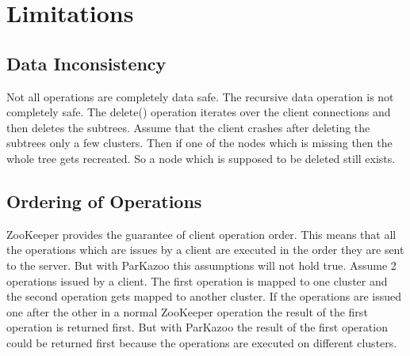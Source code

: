 \chapter{Limitations}

\section{Data Inconsistency}
Not all operations are completely data safe. The recursive data operation is not completely safe. The delete() operation iterates over the client connections and then deletes the subtrees. Assume that the client crashes after deleting the subtrees only a few clusters. Then if one of the nodes which is missing then the whole tree gets recreated. So a node which is supposed to be deleted still exists.


\section{Ordering of Operations}
ZooKeeper provides the guarantee of client operation order. This means that all the operations which are issues by a client are executed in the order they are sent to the server. But with ParKazoo this assumptions will not hold true. Assume 2 operations issued by a client. The first operation is mapped to one cluster and the second operation gets mapped to another cluster. If the operations are issued one after the other in a normal ZooKeeper operation the result of the first operation is returned first. But with ParKazoo the result of the first operation could be returned first because the operations are executed on different clusters.
